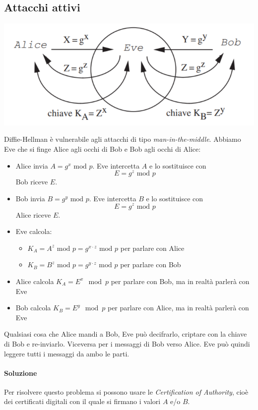 \subsection{Attacchi attivi}
\begin{center}\includegraphics[scale=.6]{images/27.PNG}\end{center}
Diffie-Hellman è vulnerabile agli attacchi di tipo \emph{man-in-the-middle}. Abbiamo Eve che si finge Alice agli occhi di Bob e Bob agli occhi di Alice:
\begin{itemize}
    \item Alice invia $ A = g^x \text{ mod } p$. Eve intercetta $A$ e lo sostituisce con $$E = g^z \text{ mod } p$$
    Bob riceve $E$.
    \item Bob invia $ B = g^y \text{ mod } p $. Eve intercetta $B$ e lo sostituisce con $$E = g^z \text{ mod } p$$
    Alice riceve $E$.
    \item Eve calcola:
    \begin{itemize}
        \item $K_A = A^z \text{ mod } p = g^{x \cdot z} \text{ mod } p$ per parlare con Alice
        \item $K_B = B^z \text{ mod } p = g^{y \cdot z} \text{ mod } p$ per parlare con Bob
    \end{itemize}
    \item Alice calcola $K_A = E^x \mod p$ per parlare con Bob, ma in realtà parlerà con Eve
    \item Bob calcola $K_B = E^y \mod p$ per parlare con Alice, ma in realtà parlerà con Eve
\end{itemize}
Qualsiasi cosa che Alice mandi a Bob, Eve può decifrarlo, criptare con la chiave di Bob e re-inviarlo.
Viceversa per i messaggi di Bob verso Alice.
Eve può quindi leggere tutti i messaggi da ambo le parti. 
\paragraph{Soluzione} Per risolvere questo problema si possono usare le \emph{Certification of Authority}, cioè dei certificati digitali con il quale si firmano i valori $A$ e/o $B$.

